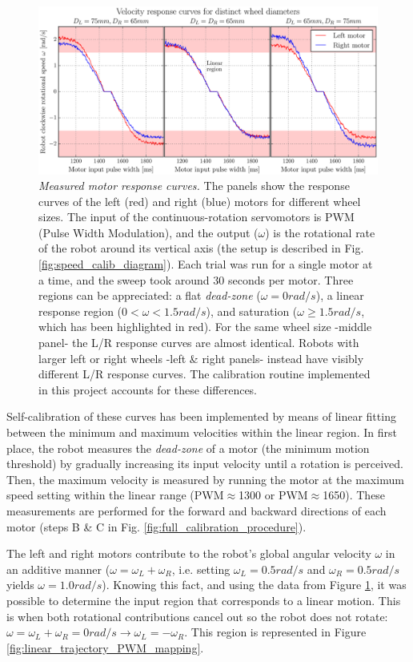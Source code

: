 \documentclass[12pt,twoside]{report}
\begin{document}
\begin{figure}[hbtp]
\centerline{
\includegraphics[width=1.15\linewidth]{velocity_response_curve}}
\caption[Measured motor response curves]{\emph{Measured motor response curves.}
The panels show the response curves of the left (red) and right (blue) motors for different wheel sizes.
The input of the continuous-rotation servomotors is PWM (Pulse Width Modulation), and the output ($\omega$) is the rotational rate of the robot around its vertical axis (the setup is described in Fig. \ref{fig:speed_calib_diagram}).
Each trial was run for a single motor at a time, and the sweep took around 30 seconds per motor.
Three regions can be appreciated: a flat \emph{dead-zone} ($\omega=0rad/s$), a linear response region ($0 < \omega < 1.5rad/s$), and saturation ($\omega \geq 1.5rad/s$, which has been highlighted in red).
For the same wheel size -middle panel- the L/R response curves are almost identical.
Robots with larger left or right wheels -left \& right panels- instead have visibly different L/R response curves.
The calibration routine implemented in this project accounts for these differences.
}
\label{fig:velocity_response_curve}
\end{figure}


Self-calibration of these curves has been implemented by means of linear fitting between the minimum and maximum velocities within the linear region. In first place, the robot measures the \emph{dead-zone} of a motor (the minimum motion threshold) by gradually increasing its input velocity until a rotation is perceived. Then, the maximum velocity is measured by running the motor at the maximum speed setting within the linear range (PWM$\approx$1300 or PWM$\approx$1650).
These measurements are performed for the forward and backward directions of each motor (steps B \& C in Fig. \ref{fig:full_calibration_procedure}).


The left and right motors contribute to the robot's global angular velocity $\omega$ in an additive manner ($\omega=\omega_L+\omega_R$, i.e. setting $\omega_L=0.5rad/s$ and $\omega_R=0.5rad/s$ yields $\omega=1.0rad/s$).
Knowing this fact, and using the data from Figure \ref{fig:velocity_response_curve}, it was possible to determine the input region that corresponds to a linear motion. This is when both rotational contributions cancel out so the robot does not rotate: $\omega=\omega_L+\omega_R=0rad/s \rightarrow \omega_L=-\omega_R$.
This region is represented in Figure \ref{fig:linear_trajectory_PWM_mapping}.
\end{document}
